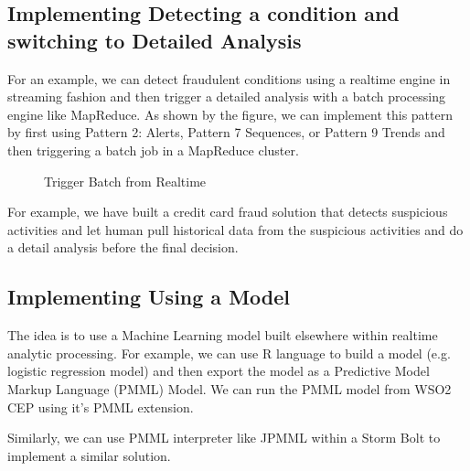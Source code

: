 \documentclass{sig-alternate}
\begin{document}
{%





\subsection{Implementing Detecting a condition and switching to Detailed Analysis}
For an example, we can detect fraudulent conditions using a realtime engine in streaming fashion and then trigger a detailed analysis with a batch processing engine like MapReduce. As shown by the figure, we can implement this pattern by first using Pattern 2: Alerts, Pattern 7 Sequences, or Pattern 9 Trends and then triggering a batch job in a MapReduce cluster. 

\begin{figure}[!htbp]
\centering
{}
\caption{Trigger Batch from Realtime}
\label{fig:q2}
\end{figure}

For example, we have built a credit card fraud solution that detects suspicious activities and let human pull historical data from the suspicious activities and do a detail analysis before the final decision. 

\subsection{Implementing Using a Model}

The idea is to use a Machine Learning model built elsewhere within realtime analytic processing. For example, we can use R language to build a model (e.g. logistic regression model) and then export the model as a Predictive Model Markup Language (PMML) Model. We can run the PMML model from WSO2 CEP using it's PMML extension. 

Similarly, we can use PMML interpreter like JPMML within a Storm Bolt to implement a similar solution. 

}
\end{document}
